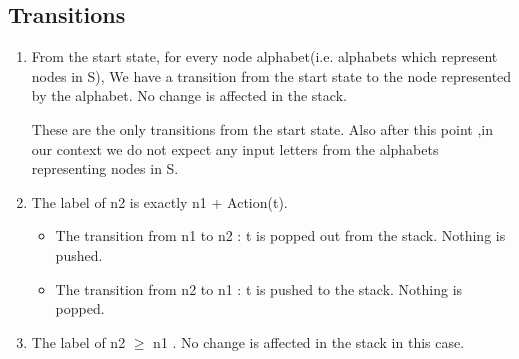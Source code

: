 \documentclass[a4paper,10pt]{article}
\begin{document}
   \subsection{Transitions}
   \begin{enumerate}
      
      \item  From the start state, for every node alphabet(i.e. alphabets which represent nodes in S),
            We have a transition from the start state to the node represented by the alphabet. 
            No change is affected in the stack. 
      \begin{center}

      \end{center}
      These are the only transitions from the start state. 
      \newline
      Also after this point ,in our context we do not expect any input letters from the 
      alphabets representing nodes in S.
      
      
      \item
      The label of n2 is exactly n1 + Action(t). 
      \begin{itemize}
        \item The transition from n1 to n2 : t is popped out from the stack. Nothing is pushed.
        \item The transition from n2 to n1 : t is pushed to the stack. Nothing is popped.
      \end{itemize}
      \begin{center}

      \end{center}
        
   
   \item
      The label of n2  $\geq$ n1 . No change is affected in the stack in this case. 
      \begin{center}


\end{center}
\end{enumerate}
\end{document}
